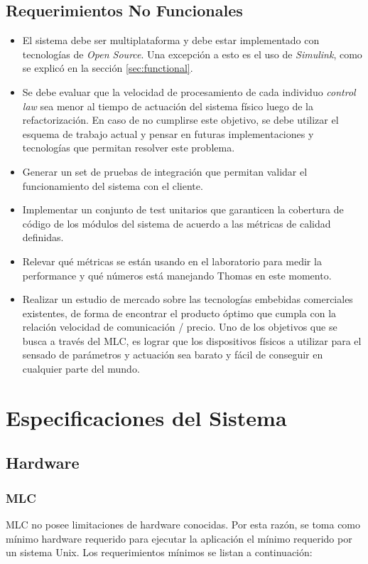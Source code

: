 \documentclass[a4paper,10pt]{article}
\begin{document}
    \subsection{Requerimientos No Funcionales} \label{sec:no_functional}
        \begin{itemize}
            \item El sistema debe ser multiplataforma y debe estar implementado con tecnologías de \textit{Open Source}. Una excepción a
            esto es el uso de \textit{Simulink}, como se explicó en la sección \ref{sec:functional}.
            \item Se debe evaluar que la velocidad de procesamiento de cada individuo \textit{control law} sea menor al tiempo de actuación 
            del sistema físico luego de la refactorización. En caso de no cumplirse este objetivo, se debe utilizar el esquema de trabajo 
            actual y pensar en futuras implementaciones y tecnologías que permitan resolver este problema.
            \item Generar un set de pruebas de integración que permitan validar el funcionamiento del sistema con el cliente.
            \item Implementar un conjunto de test unitarios que garanticen la cobertura de código de los módulos del sistema de acuerdo
            a las métricas de calidad definidas.
            \item Relevar qué métricas se están usando en el laboratorio para medir la performance y qué números está manejando Thomas en
            este momento.
            \item Realizar un estudio de mercado sobre las tecnologías embebidas comerciales existentes, de forma de encontrar el producto
            óptimo que cumpla con la relación velocidad de comunicación / precio. Uno de los objetivos que se busca a través del MLC, es
            lograr que los dispositivos físicos a utilizar para el sensado de parámetros y actuación sea barato y fácil de conseguir
            en cualquier parte del mundo.
        \end{itemize}

    \newpage
    \section{Especificaciones del Sistema}
    \subsection{Hardware}
    \subsubsection{MLC}
        MLC no posee limitaciones de hardware conocidas. Por esta razón, se toma como mínimo hardware requerido para ejecutar la
        aplicación el mínimo requerido por un sistema Unix. Los requerimientos mínimos se listan a continuación:
\end{document}
